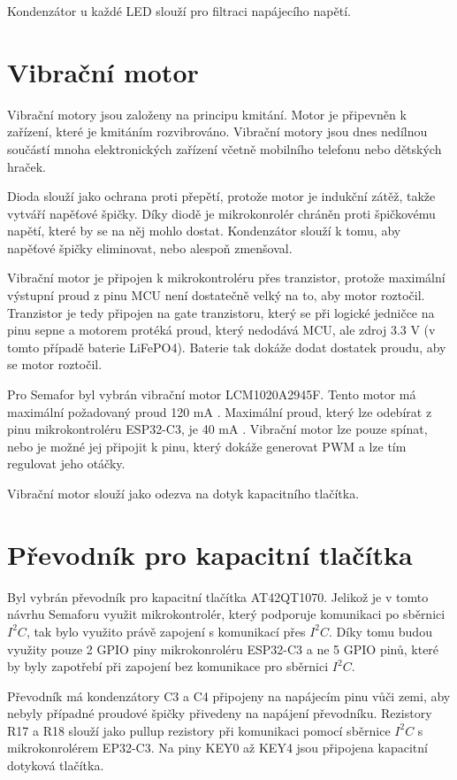 Kondenzátor u každé LED slouží pro filtraci napájecího napětí. 

\section{Vibrační motor}
Vibrační motory jsou založeny na principu kmitání. Motor je připevněn k zařízení, které je kmitáním rozvibrováno. Vibrační motory jsou dnes 
nedílnou součástí mnoha elektronických zařízení včetně mobilního telefonu nebo dětských hraček. 

Dioda slouží jako ochrana proti přepětí, protože motor je indukční zátěž, takže vytváří napěťové špičky. Díky diodě je mikrokonrolér chráněn 
proti špičkovému napětí, které by se na něj mohlo dostat. Kondenzátor slouží k tomu, aby napěťové špičky eliminovat, nebo alespoň zmenšoval. 

Vibrační motor je připojen k mikrokontroléru přes tranzistor, protože maximální výstupní proud z pinu MCU není dostatečně velký na to, aby 
motor roztočil. Tranzistor je tedy připojen na gate tranzistoru, který se při logické jedničce na pinu sepne a motorem protéká proud, který 
nedodává MCU, ale zdroj 3.3 V (v tomto případě baterie LiFePO4). Baterie tak dokáže dodat dostatek proudu, aby se motor roztočil. 

Pro Semafor byl vybrán vibrační motor LCM1020A2945F. Tento motor má maximální požadovaný proud 120 mA \cite{vib_motor_dtsh}. Maximální proud, 
který lze odebírat z pinu mikrokontroléru ESP32-C3, je 40 mA \cite{ESP_C3_dtsh}. Vibrační motor lze pouze spínat, nebo je možné jej připojit 
k pinu, který dokáže generovat PWM a lze tím regulovat jeho otáčky. 

Vibrační motor slouží jako odezva na dotyk kapacitního tlačítka. 


\section{Převodník pro kapacitní tlačítka}
Byl vybrán převodník pro kapacitní tlačítka AT42QT1070.
Jelikož je v tomto návrhu Semaforu využit mikrokontrolér, který podporuje komunikaci po sběrnici $I^2C$, tak bylo využito právě zapojení s komunikací 
přes $I^2C$. Díky tomu budou využity pouze 2 GPIO piny mikrokonroléru ESP32-C3 a ne 5 GPIO pinů, které by byly zapotřebí při zapojení bez komunikace pro
sběrnici $I^2C$.

Převodník má kondenzátory C3 a C4 připojeny na napájecím pinu vůči zemi, aby nebyly případné proudové špičky přivedeny na napájení převodníku. Rezistory
R17 a R18 slouží jako pullup rezistory při komunikaci pomocí sběrnice $I^2C$ s mikrokonrolérem EP32-C3. Na piny KEY0 až KEY4 jsou připojena kapacitní 
dotyková tlačítka.  

